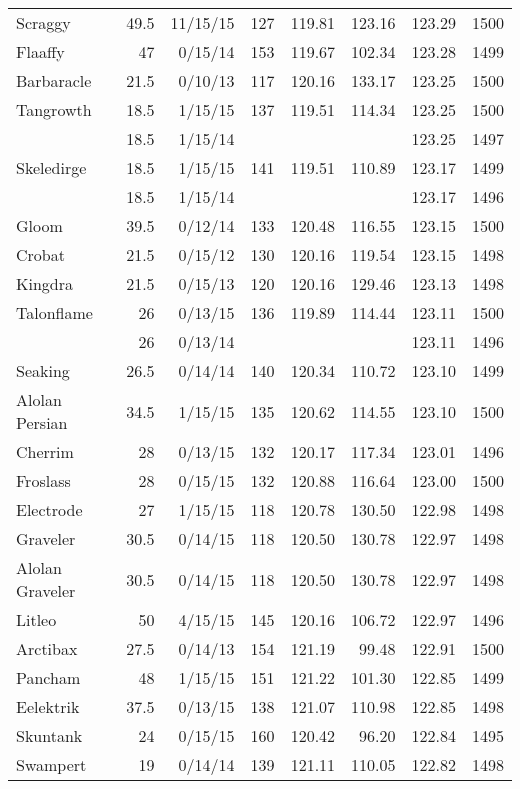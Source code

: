 \begin{longtable}{lrrrrrrr}
Scraggy & 49.5 & 11/15/15 & 127 & 119.81 & 123.16 & 123.29 & 1500\\
Flaaffy & 47 & 0/15/14 & 153 & 119.67 & 102.34 & 123.28 & 1499\\
Barbaracle & 21.5 & 0/10/13 & 117 & 120.16 & 133.17 & 123.25 & 1500\\
Tangrowth & 18.5 & 1/15/15 & 137 & 119.51 & 114.34 & 123.25 & 1500\\
 & 18.5 & 1/15/14 & & & & 123.25 & 1497\\
Skeledirge & 18.5 & 1/15/15 & 141 & 119.51 & 110.89 & 123.17 & 1499\\
 & 18.5 & 1/15/14 & & & & 123.17 & 1496\\
Gloom & 39.5 & 0/12/14 & 133 & 120.48 & 116.55 & 123.15 & 1500\\
Crobat & 21.5 & 0/15/12 & 130 & 120.16 & 119.54 & 123.15 & 1498\\
Kingdra & 21.5 & 0/15/13 & 120 & 120.16 & 129.46 & 123.13 & 1498\\
Talonflame & 26 & 0/13/15 & 136 & 119.89 & 114.44 & 123.11 & 1500\\
 & 26 & 0/13/14 & & & & 123.11 & 1496\\
Seaking & 26.5 & 0/14/14 & 140 & 120.34 & 110.72 & 123.10 & 1499\\
Alolan Persian & 34.5 & 1/15/15 & 135 & 120.62 & 114.55 & 123.10 & 1500\\
Cherrim & 28 & 0/13/15 & 132 & 120.17 & 117.34 & 123.01 & 1496\\
Froslass & 28 & 0/15/15 & 132 & 120.88 & 116.64 & 123.00 & 1500\\
Electrode & 27 & 1/15/15 & 118 & 120.78 & 130.50 & 122.98 & 1498\\
Graveler & 30.5 & 0/14/15 & 118 & 120.50 & 130.78 & 122.97 & 1498\\
Alolan Graveler & 30.5 & 0/14/15 & 118 & 120.50 & 130.78 & 122.97 & 1498\\
Litleo & 50 & 4/15/15 & 145 & 120.16 & 106.72 & 122.97 & 1496\\
Arctibax & 27.5 & 0/14/13 & 154 & 121.19 & 99.48 & 122.91 & 1500\\
Pancham & 48 & 1/15/15 & 151 & 121.22 & 101.30 & 122.85 & 1499\\
Eelektrik & 37.5 & 0/13/15 & 138 & 121.07 & 110.98 & 122.85 & 1498\\
Skuntank & 24 & 0/15/15 & 160 & 120.42 & 96.20 & 122.84 & 1495\\
Swampert & 19 & 0/14/14 & 139 & 121.11 & 110.05 & 122.82 & 1498\\

\end{longtable}
